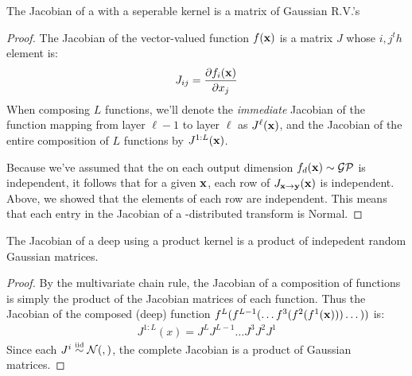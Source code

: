 \documentclass{article}
\newcommand{\fdeep}{f^{1:L}}
\newcommand{\Jx}{J_{\vx \rightarrow \vy}}
\newcommand{\Jxx}{J_{\vx \rightarrow \vy}(\vx)}
\newcommand{\Jy}{J_{\vy \rightarrow \vx}}
\begin{document}
\begin{lemma}
The Jacobian of a \gp{} with a seperable kernel is a matrix of \iid Gaussian R.V.'s
\end{lemma}
%
\begin{proof}
The Jacobian of the vector-valued function $f({\bf{x}})$ is a matrix $J$ whose $i,j^th$ element is:
%
\begin{align}
J_{ij} = \dfrac{\partial f_i ({\bf{x}}) }{\partial x_j}
\end{align}
%
When composing $L$ functions, we'll denote the \emph{immediate} Jacobian of the function mapping from layer $\ell -1$ to layer $\ell$ as $J^\ell({\bf{x}})$, and the Jacobian of the entire composition of $L$ functions by $J^{1:L}({\bf{x}})$.

Because we've assumed that the \gp{} on each output dimension $f_d({\bf{x}}) \sim \mathcal{GP}$ is independent, it follows that for a given ${\bf{x}}$, each row of $\Jxx$ is independent.
Above, we showed that the elements of each row are independent.
This means that each entry in the Jacobian of a \gp{}-distributed transform is \iid Normal.
\end{proof}


\begin{theorem}
The Jacobian of a deep \gp{} using a product kernel is a product of indepedent random Gaussian matrices.
\end{theorem}
%
\begin{proof}
By the multivariate chain rule, the Jacobian of a composition of functions is simply the product of the Jacobian matrices of each function.  
%
Thus the Jacobian of the composed (deep) function $f^L(f^{L-1}(\dots f^3(f^2(f^1({\bf{x}})))\dots))$ is:
%
\begin{align}
J^{1:L}(x) 
= J^L J^{L-1} \dots J^3 J^2 J^1
\end{align}
Since each $J^i \simiid \Nt{}{}$, the complete Jacobian is a product of \iid{} Gaussian matrices.
\end{proof}
\end{document}
